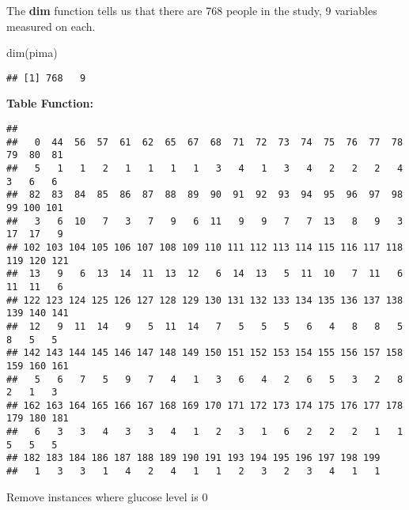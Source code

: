 \documentclass[
]{article}
\newenvironment{Shaded}{\begin{snugshade}}{\end{snugshade}}
\newcommand{\DecValTok}[1]{\textcolor[rgb]{0.00,0.00,0.81}{#1}}
\newcommand{\FunctionTok}[1]{\textcolor[rgb]{0.00,0.00,0.00}{#1}}
\newcommand{\NormalTok}[1]{#1}
\newcommand{\OtherTok}[1]{\textcolor[rgb]{0.56,0.35,0.01}{#1}}
\newcommand{\SpecialCharTok}[1]{\textcolor[rgb]{0.00,0.00,0.00}{#1}}
\begin{document}
The \textbf{dim} function tells us that there are 768 people in the
study, 9 variables measured on each.

\begin{Shaded}
\begin{Highlighting}[]
\FunctionTok{dim}\NormalTok{(pima)}
\end{Highlighting}
\end{Shaded}

\begin{verbatim}
## [1] 768   9
\end{verbatim}

\textbf{Table Function:}

\begin{Shaded}
\end{Shaded}

\begin{verbatim}
## 
##   0  44  56  57  61  62  65  67  68  71  72  73  74  75  76  77  78  79  80  81 
##   5   1   1   2   1   1   1   1   3   4   1   3   4   2   2   2   4   3   6   6 
##  82  83  84  85  86  87  88  89  90  91  92  93  94  95  96  97  98  99 100 101 
##   3   6  10   7   3   7   9   6  11   9   9   7   7  13   8   9   3  17  17   9 
## 102 103 104 105 106 107 108 109 110 111 112 113 114 115 116 117 118 119 120 121 
##  13   9   6  13  14  11  13  12   6  14  13   5  11  10   7  11   6  11  11   6 
## 122 123 124 125 126 127 128 129 130 131 132 133 134 135 136 137 138 139 140 141 
##  12   9  11  14   9   5  11  14   7   5   5   5   6   4   8   8   5   8   5   5 
## 142 143 144 145 146 147 148 149 150 151 152 153 154 155 156 157 158 159 160 161 
##   5   6   7   5   9   7   4   1   3   6   4   2   6   5   3   2   8   2   1   3 
## 162 163 164 165 166 167 168 169 170 171 172 173 174 175 176 177 178 179 180 181 
##   6   3   3   4   3   3   4   1   2   3   1   6   2   2   2   1   1   5   5   5 
## 182 183 184 186 187 188 189 190 191 193 194 195 196 197 198 199 
##   1   3   3   1   4   2   4   1   1   2   3   2   3   4   1   1
\end{verbatim}

Remove instances where glucose level is 0

\begin{Shaded}
\end{Shaded}
\end{document}
